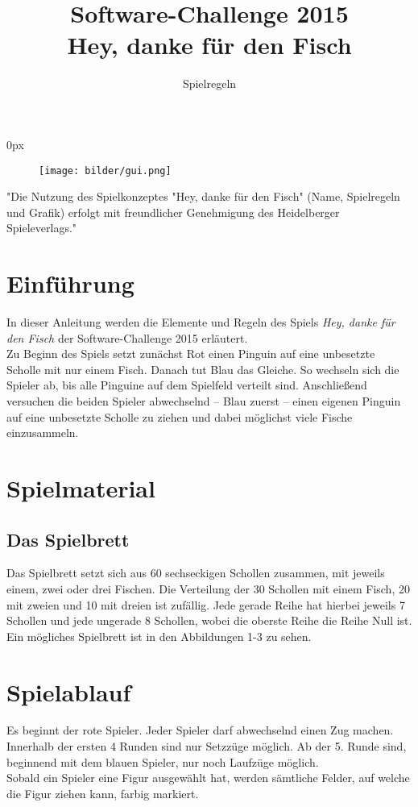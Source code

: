 \documentclass[a4paper, ngerman]{scrartcl}
\title{Software-Challenge 2015 \\ Hey, danke für den Fisch}
\subtitle{Spielregeln}
\begin{document}
 
\parindent0px
\maketitle

\begin{figure}[h!]
	\centering
	\texttt{[image: bilder/gui.png]} 
\end{figure}
\vspace*{\fill}
"Die Nutzung des Spielkonzeptes "Hey, danke für den Fisch" (Name, Spielregeln
und Grafik) erfolgt mit freundlicher Genehmigung des Heidelberger
Spieleverlags."
\newpage
\tableofcontents
\newpage

\section{Einführung}
In dieser Anleitung werden die Elemente und Regeln des Spiels \emph{Hey, danke
für den Fisch} der Software-Challenge 2015 erläutert.\\
Zu Beginn des Spiels setzt zunächst Rot einen Pinguin auf eine unbesetzte Scholle mit nur einem Fisch. Danach tut Blau das Gleiche. So wechseln sich die Spieler ab, bis alle Pinguine auf dem Spielfeld verteilt sind.
Anschließend versuchen die beiden Spieler abwechselnd – Blau zuerst – einen eigenen Pinguin auf eine unbesetzte Scholle zu ziehen und dabei möglichst viele Fische einzusammeln.

\section{Spielmaterial}
	\subsection{Das Spielbrett}
Das Spielbrett setzt sich aus 60 sechseckigen Schollen zusammen,
mit jeweils einem, zwei oder drei Fischen.
Die Verteilung der 30 Schollen mit einem Fisch, 20 mit zweien und 10 mit
dreien ist zufällig.
Jede gerade Reihe hat hierbei jeweils 7 Schollen und jede ungerade 8
Schollen, wobei die oberste Reihe die Reihe Null ist. Ein mögliches
Spielbrett ist in den Abbildungen 1-3 zu sehen.
\section{Spielablauf}	 

	Es beginnt der rote Spieler. Jeder Spieler darf abwechselnd einen
	Zug machen. Innerhalb der ersten 4 Runden sind nur Setzzüge möglich. Ab der
	5.
	Runde sind, beginnend mit dem blauen Spieler, nur noch Laufzüge möglich.\\
	Sobald ein Spieler eine Figur ausgewählt hat, werden sämtliche Felder, auf
	welche die Figur ziehen kann, farbig markiert.
	 
\end{document}
